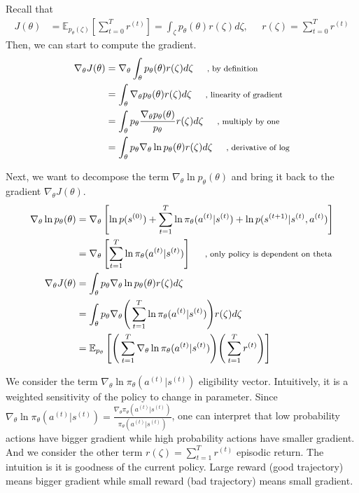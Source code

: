 \documentclass[11pt]{article}
\begin{document}
Recall that
\begin{align*}
    J(\theta)&  = \mathbb{E}_{p_\theta(\zeta)}\left[\sum_{t=0}^Tr^{(t)}\right] = \int_\zeta p_\theta(\theta)r(\zeta)d\zeta, \;\;\;\;\; r(\zeta) = \sum_{t=0}^Tr^{(t)}
\end{align*}
Then, we can start to compute the gradient.
\begin{align*}
    \nabla_\theta J(\theta) & = \nabla_\theta \int_\theta p_\theta(\theta)r(\zeta)d\zeta \;\;\;\;\; \text{\footnotesize{, by definition}}\\
    & = \int_\theta \nabla_\theta p_\theta(\theta)r(\zeta)d\zeta \;\;\;\;\; \text{\footnotesize{, linearity of gradient}}\\
    & = \int_\theta p_\theta \frac{\nabla_\theta p_\theta(\theta)}{p_\theta}r(\zeta)d\zeta \;\;\;\;\; \text{\footnotesize{, multiply by one}}\\
    & = \int_\theta p_\theta \nabla_\theta \ln p_\theta(\theta)r(\zeta)d\zeta \;\;\;\;\; \text{\footnotesize{, derivative of log}}
\end{align*}

Next, we want to decompose the term $\nabla_\theta \ln p_\theta(\theta)$ and bring it back to the gradient $\nabla_\theta J(\theta)$.
\begin{align*}
    \nabla_\theta \ln p_\theta(\theta) & = \nabla_\theta \left[ \ln p(s^{(0)}) + \sum_{t=1}^T \ln \pi_\theta(a^{(t)}|s^{(t)}) + \ln p(s^{(t+1)}|s^{(t)}, a^{(t)}) \right] \\
    & = \nabla_\theta \left[ \sum_{t=1}^T \ln \pi_\theta(a^{(t)}|s^{(t)})  \right]\;\;\;\;\; \text{\footnotesize{, only policy is dependent on theta}} \\
    \nabla_\theta J(\theta) & = \int_\theta p_\theta \nabla_\theta \ln p_\theta(\theta)r(\zeta)d\zeta \\
    & = \int_\theta p_\theta \nabla_\theta \Bigg(\sum_{t=1}^T \ln \pi_\theta(a^{(t)}|s^{(t)})\Bigg) r(\zeta)d\zeta \\
    & = \mathbb{E}_{p_\theta}\left[ \Bigg( \sum_{t=1}^T \nabla_\theta \ln \pi_\theta(a^{(t)}|s^{(t)}) \Bigg) \Bigg( \sum_{t=1}^T r^{(t)} \Bigg) \right]
\end{align*}

We consider the term $\nabla_\theta \ln \pi_\theta(a^{(t)}|s^{(t)})$ eligibility vector. Intuitively, it is a weighted sensitivity of the policy to change in parameter. Since $\nabla_\theta \ln \pi_\theta(a^{(t)}|s^{(t)}) = \frac{\nabla_\theta \pi_\theta(a^{(t)}|s^{(t)})}{\pi_\theta(a^{(t)}|s^{(t)})}$, one can interpret that low probability actions have bigger gradient while high probability actions have smaller gradient. And we consider the other term $r(\zeta) = \sum_{t=1}^T r^{(t)}$ episodic return. The intuition is it is goodness of the current policy. Large reward (good trajectory) means bigger gradient while small reward (bad trajectory) means small gradient.
\end{document}

